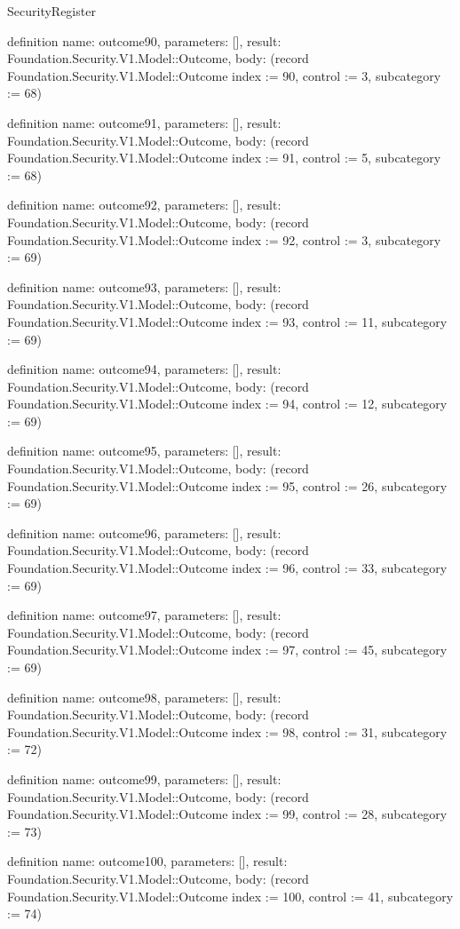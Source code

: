 \begin{lexlean}{SecurityRegister}
\begin{semanticmodule}
definition{
  name: outcome90,
  parameters: [],
  result: Foundation.Security.V1.Model::Outcome,
  body: (record Foundation.Security.V1.Model::Outcome {index := 90, control := 3, subcategory := 68})
}

definition{
  name: outcome91,
  parameters: [],
  result: Foundation.Security.V1.Model::Outcome,
  body: (record Foundation.Security.V1.Model::Outcome {index := 91, control := 5, subcategory := 68})
}

definition{
  name: outcome92,
  parameters: [],
  result: Foundation.Security.V1.Model::Outcome,
  body: (record Foundation.Security.V1.Model::Outcome {index := 92, control := 3, subcategory := 69})
}

definition{
  name: outcome93,
  parameters: [],
  result: Foundation.Security.V1.Model::Outcome,
  body: (record Foundation.Security.V1.Model::Outcome {index := 93, control := 11, subcategory := 69})
}

definition{
  name: outcome94,
  parameters: [],
  result: Foundation.Security.V1.Model::Outcome,
  body: (record Foundation.Security.V1.Model::Outcome {index := 94, control := 12, subcategory := 69})
}

definition{
  name: outcome95,
  parameters: [],
  result: Foundation.Security.V1.Model::Outcome,
  body: (record Foundation.Security.V1.Model::Outcome {index := 95, control := 26, subcategory := 69})
}

definition{
  name: outcome96,
  parameters: [],
  result: Foundation.Security.V1.Model::Outcome,
  body: (record Foundation.Security.V1.Model::Outcome {index := 96, control := 33, subcategory := 69})
}

definition{
  name: outcome97,
  parameters: [],
  result: Foundation.Security.V1.Model::Outcome,
  body: (record Foundation.Security.V1.Model::Outcome {index := 97, control := 45, subcategory := 69})
}

definition{
  name: outcome98,
  parameters: [],
  result: Foundation.Security.V1.Model::Outcome,
  body: (record Foundation.Security.V1.Model::Outcome {index := 98, control := 31, subcategory := 72})
}

definition{
  name: outcome99,
  parameters: [],
  result: Foundation.Security.V1.Model::Outcome,
  body: (record Foundation.Security.V1.Model::Outcome {index := 99, control := 28, subcategory := 73})
}

definition{
  name: outcome100,
  parameters: [],
  result: Foundation.Security.V1.Model::Outcome,
  body: (record Foundation.Security.V1.Model::Outcome {index := 100, control := 41, subcategory := 74})
}


\end{semanticmodule}
\end{lexlean}
